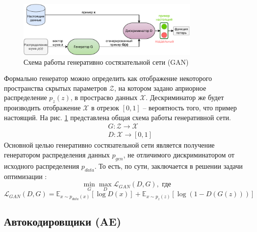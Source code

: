 \documentclass[11pt,a4paper]{extarticle}
\begin{document}
			\begin{figure}[ht]
				\centering
				\includegraphics[width=0.8\textwidth]{img/gan}
				\caption{Схема работы генеративно состязательной сети (GAN)}
				\label{fig:gan}
			\end{figure}
			\noindent
			Формально генератор можно определить как отображение некоторого пространства скрытых параметров $\mathcal{Z}$,
			на котором задано априорное распределение \(p_z(z)\), в прострасво данных $\mathcal{X}$.
			Дескриминатор же будет производить отображение $\mathcal{X}$ в отрезок $[0,1]$ -- вероятность того, что пример настоящий.
			На рис. \ref{fig:gan} представлена общая схема работы генеративной сети.
			\begin{equation}
				\begin{aligned}
					& G\!:{\mathcal{Z}}\rightarrow {\mathcal{X}} \\
					& D\!:{\mathcal{X}}\rightarrow [0,1]
				\end{aligned}
			\end{equation}
			Основной целью генеративно состязательной сети является получение генератором распределения данных $p_{gen}$,
			не отличимого дискриминатором от исходного распределения $p_{data}$.
			То есть, по сути, заключается в решении задачи оптимизации \cite{Deep_Learning}:
			\begin{equation}\label{eq:gan}
				\min_{G} \max_{D} \mathcal{L}_{GAN}(D,G), \text{ где }
			\end{equation}
			\begin{equation*}
				\mathcal{L}_{GAN}(D,G) = \mathbb{E}_{x∼p_{data}(x)}[\log{D(x)}] + \mathbb{E}_{x∼p_{z}(z)}[\log (1 - D(G(z)))]
			\end{equation*}
			\indent

		\subsection{Автокодировщики (AE)}		
		
\end{document}
